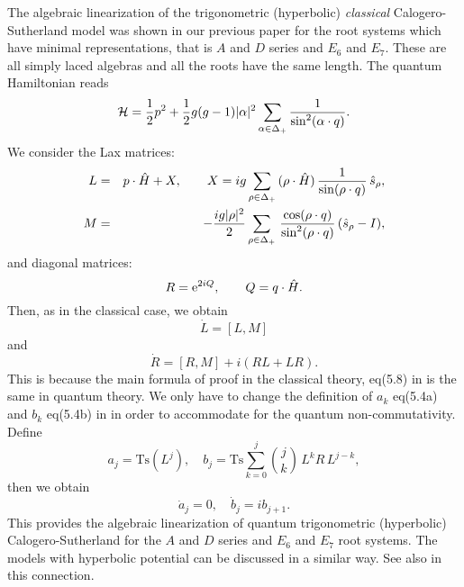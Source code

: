 \documentclass[a4paper,12pt]{article}
\begin{document}
The algebraic linearization of the trigonometric (hyperbolic)
{\em classical} Calogero-Sutherland
model was shown in our previous paper \cite{cfs} for the root systems
which have minimal representations,
that is $A$ and $D$ series and $E_6$ and $E_7$. These are all
simply laced algebras and all the roots have the same length.
The quantum Hamiltonian reads
\begin{equation}
    {\cal H}={1\over2}p^2+
       {1\over2}g(g-1)|\alpha|^{2}\sum_{\alpha\in\Delta_+}
          {1\over{\sin^{2}(\alpha\cdot q)}}.
          \label{(5.1)}
\end{equation}
        We consider the Lax matrices:
\begin{eqnarray}
L&=&p\cdot\hat{H}+X, \qquad
X=ig\sum_{\rho\in\Delta_{+}}\thinspace
   (\rho\cdot\hat{H})\thinspace{1\over{\sin(\rho\cdot
   q)}}\thinspace\hat{s}_{\rho}, \label{(5.2b)}\\
M&=&-{ig|\rho|^2\over2}\sum_{\rho\in\Delta_{+}}\thinspace
   {\cos(\rho\cdot q)\over{\sin^{2}(\rho\cdot q)}}
   \thinspace(\hat{s}_{\rho}-I),
\label{(5.2c)}
\end{eqnarray}
and diagonal matrices:
\begin{equation}
R={{\rm e}}^{2iQ},\qquad
Q=q\cdot\hat{H}.
\end{equation}
Then, as in the classical case, we obtain
\begin{equation}
\dot{L}=[L,M]
\end{equation} and
\begin{equation}
\dot{R}=[R,M]+i(RL+LR).
\end{equation}
This is because the main formula of proof
in the classical theory, eq(5.8) in
\cite{cfs} is the same in quantum theory.
We only have to change the definition of $a_k$ eq(5.4a) and $b_k$ eq(5.4b)
in
\cite{cfs} in order to accommodate for the quantum non-commutativity.
Define
\begin{equation}\label{TFks}
  a_j=\mbox{Ts}(L^j),\quad
  b_j=\mbox{Ts}\sum_{k=0}^j{j \choose k}
    \, L^k R\, L^{j-k},
\end{equation}
then we obtain
\begin{equation}
\dot{a}_j=0,\quad \dot{b}_j=ib_{j+1}.
\end{equation}
This provides the algebraic linearization of quantum
trigonometric (hyperbolic) Calogero-Sutherland for the
$A$ and $D$ series and $E_6$ and $E_7$ root systems.
The models with hyperbolic potential can be discussed in a
similar way.
See also \cite{Gonera2,ttw} in this connection.
\end{document}
